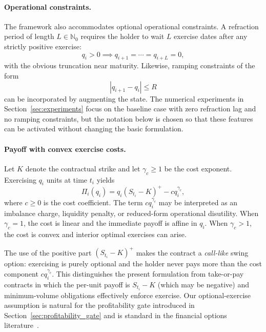 \documentclass[a4paper,fleqn]{cas-dc}
\begin{document}
\paragraph{Operational constraints.}
The framework also accommodates optional operational constraints. A refraction period of length $L \in \mathbb{N}_0$ requires the holder to wait $L$ exercise dates after any strictly positive exercise:
\[
    q_i > 0 \implies q_{i+1} = \cdots = q_{i+L} = 0,
\]
with the obvious truncation near maturity. Likewise, ramping constraints of the form
\[
    |q_{i+1} - q_i| \le R
\]
can be incorporated by augmenting the state. The numerical experiments in Section~\ref{sec:experiments} focus on the baseline case with zero refraction lag and no ramping constraints, but the notation below is chosen so that these features can be activated without changing the basic formulation.

\paragraph{Payoff with convex exercise costs.}
Let $K$ denote the contractual strike and let $\gamma_c \ge 1$ be the cost exponent. Exercising $q_i$ units at time $t_i$ yields
\begin{equation}
    \label{eq:payoff}
    \Pi_i(q_i) = q_i (S_{t_i} - K)^+ - c q_i^{\gamma_c},
\end{equation}
where $c \ge 0$ is the cost coefficient. The term $c q_i^{\gamma_c}$ may be interpreted as an imbalance charge, liquidity penalty, or reduced-form operational disutility. When $\gamma_c = 1$, the cost is linear and the immediate payoff is affine in $q_i$. When $\gamma_c > 1$, the cost is convex and interior optimal exercises can arise.

The use of the positive part $(S_{t_i} - K)^+$ makes the contract a \emph{call-like} swing option: exercising is purely optional and the holder never pays more than the cost component $c q_i^{\gamma_c}$. This distinguishes the present formulation from take-or-pay contracts in which the per-unit payoff is $S_{t_i} - K$ (which may be negative) and minimum-volume obligations effectively enforce exercise. Our optional-exercise assumption is natural for the profitability gate introduced in Section~\ref{sec:profitability_gate} and is standard in the financial options literature~\cite{jaillet2004valuation,carmona2008swing}.
\end{document}
